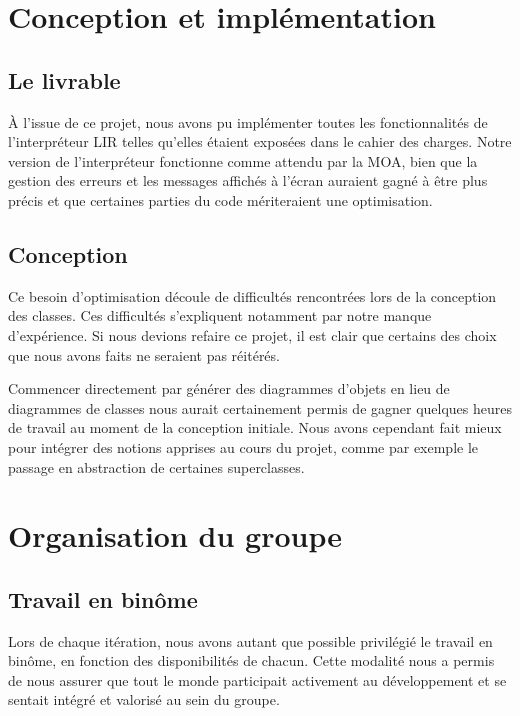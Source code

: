 \chapter{Conception et implémentation}

\section{Le livrable}

    \`{A} l'issue de ce projet, nous avons pu implémenter toutes les fonctionnalités de
    l'interpréteur LIR telles qu'elles étaient exposées dans le cahier des charges. Notre
    version de l'interpréteur fonctionne comme attendu par la MOA, bien que la gestion
    des erreurs et les messages affichés à l'écran auraient gagné à être plus précis et
    que certaines parties du code mériteraient une optimisation.

\section{Conception}

    Ce besoin d'optimisation découle de difficultés rencontrées lors de la conception des
    classes. Ces difficultés s'expliquent notamment par notre manque d'expérience. Si nous
    devions refaire ce projet, il est clair que certains des choix que nous avons faits ne
    seraient pas réitérés.

    Commencer directement par générer des diagrammes d'objets en lieu de diagrammes de
    classes nous aurait certainement permis de gagner quelques heures de travail au moment
    de la conception initiale. Nous avons cependant fait mieux pour intégrer des notions
    apprises au cours du projet, comme par exemple le passage en abstraction de certaines
    superclasses.

\chapter{Organisation du groupe}

    \section{Travail en binôme}

        Lors de chaque itération, nous avons autant que possible privilégié le travail
        en binôme, en fonction des disponibilités de chacun. Cette modalité nous a permis
        de nous assurer que tout le monde participait activement au développement et se
        sentait intégré et valorisé au sein du groupe.

